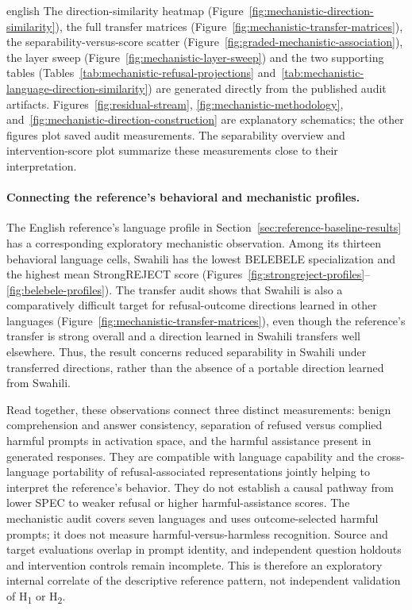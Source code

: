 \begin{otherlanguage*}{english}
The direction-similarity heatmap (Figure~\ref{fig:mechanistic-direction-similarity}), the full transfer matrices (Figure~\ref{fig:mechanistic-transfer-matrices}), the separability-versus-score scatter (Figure~\ref{fig:graded-mechanistic-association}), the layer sweep (Figure~\ref{fig:mechanistic-layer-sweep}) and the two supporting tables (Tables~\ref{tab:mechanistic-refusal-projections} and~\ref{tab:mechanistic-language-direction-similarity}) are generated directly from the published audit artifacts. Figures~\ref{fig:residual-stream}, \ref{fig:mechanistic-methodology}, and~\ref{fig:mechanistic-direction-construction} are explanatory schematics; the other figures plot saved audit measurements. The separability overview and intervention-score plot summarize these measurements close to their interpretation.

\MechTransferAnalysisText

\paragraph*{Connecting the reference's behavioral and mechanistic profiles.} The English reference's language profile in Section~\ref{sec:reference-baseline-results} has a corresponding exploratory mechanistic observation. Among its thirteen behavioral language cells, Swahili has the lowest BELEBELE specialization and the highest mean StrongREJECT score (Figures~\ref{fig:strongreject-profiles}--\ref{fig:belebele-profiles}). The transfer audit shows that Swahili is also a comparatively difficult target for refusal-outcome directions learned in other languages (Figure~\ref{fig:mechanistic-transfer-matrices}), even though the reference's transfer is strong overall and a direction learned in Swahili transfers well elsewhere. Thus, the result concerns reduced separability in Swahili under transferred directions, rather than the absence of a portable direction learned from Swahili.

Read together, these observations connect three distinct measurements: benign comprehension and answer consistency, separation of refused versus complied harmful prompts in activation space, and the harmful assistance present in generated responses. They are compatible with language capability and the cross-language portability of refusal-associated representations jointly helping to interpret the reference's behavior. They do not establish a causal pathway from lower SPEC to weaker refusal or higher harmful-assistance scores. The mechanistic audit covers seven languages and uses outcome-selected harmful prompts; it does not measure harmful-versus-harmless recognition. Source and target evaluations overlap in prompt identity, and independent question holdouts and intervention controls remain incomplete. This is therefore an exploratory internal correlate of the descriptive reference pattern, not independent validation of H\textsubscript{1} or H\textsubscript{2}.


\end{otherlanguage*}
